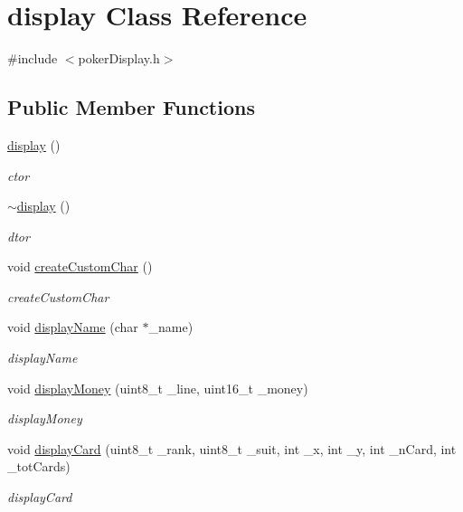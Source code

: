 \hypertarget{classdisplay}{\section{display Class Reference}
\label{classdisplay}
}


{\ttfamily \#include $<$poker\-Display.\-h$>$}

\subsection*{Public Member Functions}
\begin{DoxyCompactItemize}
\item 
\hyperlink{classdisplay_a1385d21e9490cbf02de742f3e586d56a}{display} ()
\begin{DoxyCompactList}\small\item\em ctor \end{DoxyCompactList}\item 
\hyperlink{classdisplay_ad374b33e5b1e44901b972f0b0fe36512}{$\sim$display} ()
\begin{DoxyCompactList}\small\item\em dtor \end{DoxyCompactList}\item 
void \hyperlink{classdisplay_adb4f6871f592055425efad3d52a166e0}{create\-Custom\-Char} ()
\begin{DoxyCompactList}\small\item\em create\-Custom\-Char \end{DoxyCompactList}\item 
void \hyperlink{classdisplay_a24112c3835b034795be56e0d26852283}{display\-Name} (char $\ast$\-\_\-name)
\begin{DoxyCompactList}\small\item\em display\-Name \end{DoxyCompactList}\item 
void \hyperlink{classdisplay_ae19aeed36c8f091ebb0876368877d082}{display\-Money} (uint8\-\_\-t \-\_\-line, uint16\-\_\-t \-\_\-money)
\begin{DoxyCompactList}\small\item\em display\-Money \end{DoxyCompactList}\item 
void \hyperlink{classdisplay_a6cbb4e91d052cb77ef65101e47529686}{display\-Card} (uint8\-\_\-t \-\_\-rank, uint8\-\_\-t \-\_\-suit, int \-\_\-x, int \-\_\-y, int \-\_\-n\-Card, int \-\_\-tot\-Cards)
\begin{DoxyCompactList}\small\item\em display\-Card \end{DoxyCompactList}\item 

\end{DoxyCompactItemize}

